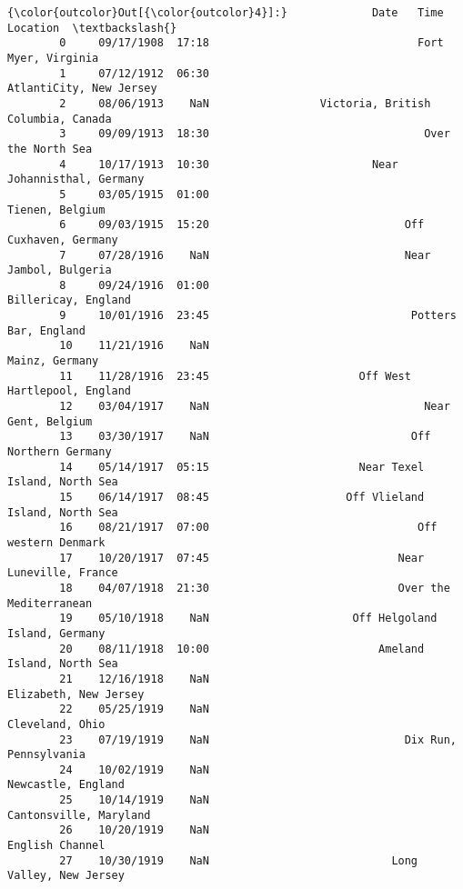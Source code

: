 \documentclass[11pt]{article}
\begin{document}
\begin{Verbatim}[commandchars=\\\{\}]
{\color{outcolor}Out[{\color{outcolor}4}]:}             Date   Time                                           Location  \textbackslash{}
        0     09/17/1908  17:18                                Fort Myer, Virginia   
        1     07/12/1912  06:30                            AtlantiCity, New Jersey   
        2     08/06/1913    NaN                 Victoria, British Columbia, Canada   
        3     09/09/1913  18:30                                 Over the North Sea   
        4     10/17/1913  10:30                         Near Johannisthal, Germany   
        5     03/05/1915  01:00                                    Tienen, Belgium   
        6     09/03/1915  15:20                              Off Cuxhaven, Germany   
        7     07/28/1916    NaN                              Near Jambol, Bulgeria   
        8     09/24/1916  01:00                                Billericay, England   
        9     10/01/1916  23:45                               Potters Bar, England   
        10    11/21/1916    NaN                                     Mainz, Germany   
        11    11/28/1916  23:45                       Off West Hartlepool, England   
        12    03/04/1917    NaN                                 Near Gent, Belgium   
        13    03/30/1917    NaN                               Off Northern Germany   
        14    05/14/1917  05:15                       Near Texel Island, North Sea   
        15    06/14/1917  08:45                     Off Vlieland Island, North Sea   
        16    08/21/1917  07:00                                Off western Denmark   
        17    10/20/1917  07:45                             Near Luneville, France   
        18    04/07/1918  21:30                             Over the Mediterranean   
        19    05/10/1918    NaN                      Off Helgoland Island, Germany   
        20    08/11/1918  10:00                          Ameland Island, North Sea   
        21    12/16/1918    NaN                              Elizabeth, New Jersey   
        22    05/25/1919    NaN                                    Cleveland, Ohio   
        23    07/19/1919    NaN                              Dix Run, Pennsylvania   
        24    10/02/1919    NaN                                 Newcastle, England   
        25    10/14/1919    NaN                             Cantonsville, Maryland   
        26    10/20/1919    NaN                                    English Channel   
        27    10/30/1919    NaN                            Long Valley, New Jersey   

\end{Verbatim}
\end{document}

